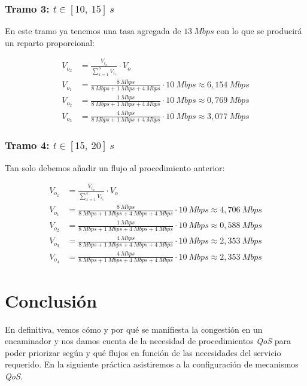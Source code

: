 \documentclass[11pt]{article}
\begin{document}
            \subsubsection{Tramo 3: $t \in [10,\ 15]\ s$}
                En este tramo ya tenemos una tasa agregada de $13\ Mbps$ con lo que se producirá un reparto proporcional:

                \begin{align*}
                    V_{o_x} &= \frac{V_{i_x}}{\sum_{x = 1}^3 V_{i_x}} \cdot V_o\\
                    V_{o_1} &= \frac{8\ Mbps}{8\ Mbps + 1\ Mbps + 4\ Mbps} \cdot 10\ Mbps \approx 6,154\ Mbps\\
                    V_{o_2} &= \frac{1\ Mbps}{8\ Mbps + 1\ Mbps + 4\ Mbps} \cdot 10\ Mbps \approx 0,769\ Mbps\\
                    V_{o_3} &= \frac{4\ Mbps}{8\ Mbps + 1\ Mbps + 4\ Mbps} \cdot 10\ Mbps \approx 3,077\ Mbps
                \end{align*}

            \subsubsection{Tramo 4: $t \in [15,\ 20]\ s$}
                Tan solo debemos añadir un flujo al procedimiento anterior:

                \begin{align*}
                    V_{o_x} &= \frac{V_{i_x}}{\sum_{x = 1}^4 V_{i_x}} \cdot V_o\\
                    V_{o_1} &= \frac{8\ Mbps}{8\ Mbps + 1\ Mbps + 4\ Mbps + 4\ Mbps} \cdot 10\ Mbps \approx 4,706\ Mbps\\
                    V_{o_2} &= \frac{1\ Mbps}{8\ Mbps + 1\ Mbps + 4\ Mbps + 4\ Mbps} \cdot 10\ Mbps \approx 0,588\ Mbps\\
                    V_{o_3} &= \frac{4\ Mbps}{8\ Mbps + 1\ Mbps + 4\ Mbps + 4\ Mbps} \cdot 10\ Mbps \approx 2,353\ Mbps\\
                    V_{o_4} &= \frac{4\ Mbps}{8\ Mbps + 1\ Mbps + 4\ Mbps + 4\ Mbps} \cdot 10\ Mbps \approx 2,353\ Mbps
                \end{align*}

    \section{Conclusión}
        En definitiva, vemos cómo y por qué se manifiesta la congestión en un encaminador y nos damos cuenta de la necesidad de procedimientos \textit{QoS} para poder priorizar según y qué flujos en función de las necesidades del servicio requerido. En la siguiente práctica asistiremos a la configuración de mecanismos \textit{QoS}.
\end{document}
